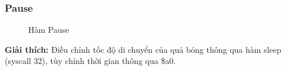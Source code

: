 \documentclass[a4paper,12pt]{article}
\begin{document}
    \subsubsection{Pause}
    \FloatBarrier
    \begin{figure}[ht!]
    	\centerline{}
    	\caption{Hàm Pause}
    	\label{fig:bai6}
    \end{figure}
    \noindent
    \textbf{Giải thích:} Điều chỉnh tốc độ di chuyển của quả bóng thông qua hàm sleep (syscall 32), tùy chỉnh thời gian thông qua \$a0.
    \clearpage
\end{document}
